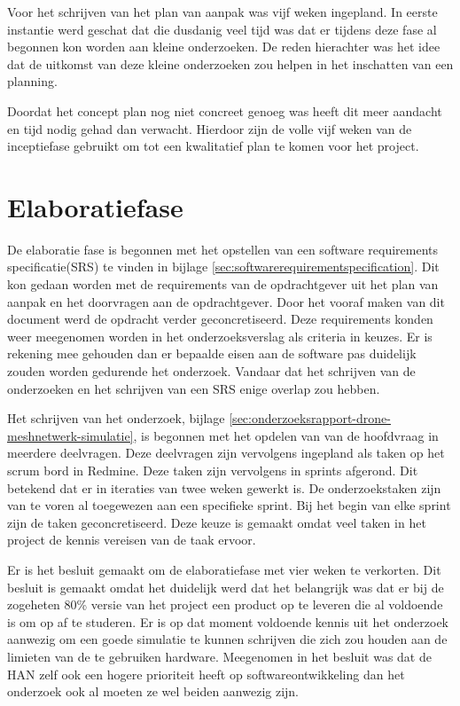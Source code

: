 \documentclass[a4paper, 11pt, oneside]{report}
\begin{document}
Voor het schrijven van het plan van aanpak was vijf weken ingepland. 
In eerste instantie werd geschat dat die dusdanig veel tijd was dat er tijdens deze fase al begonnen kon worden aan kleine onderzoeken.
De reden hierachter was het idee dat de uitkomst van deze kleine onderzoeken zou helpen in het inschatten van een planning.

Doordat het concept plan nog niet concreet genoeg was heeft dit meer aandacht en tijd nodig gehad dan verwacht. 
Hierdoor zijn de volle vijf weken van de inceptiefase gebruikt om tot een kwalitatief plan te komen voor het project.

\section{Elaboratiefase}\label{sec:elaboratiefase}

De elaboratie fase is begonnen met het opstellen van een software requirements specificatie(SRS) te vinden in bijlage \ref{sec:softwarerequirementspecification}.
Dit kon gedaan worden met de requirements van de opdrachtgever uit het plan van aanpak en het doorvragen aan de opdrachtgever.
Door het vooraf maken van dit document werd de opdracht verder geconcretiseerd.
Deze requirements konden weer meegenomen worden in het onderzoeksverslag als criteria in keuzes.  
Er is rekening mee gehouden dan er bepaalde eisen aan de software pas duidelijk zouden worden gedurende het onderzoek.
Vandaar dat het schrijven van de onderzoeken en het schrijven van een SRS enige overlap zou hebben. 

Het schrijven van het onderzoek, bijlage \ref{sec:onderzoeksrapport-drone-meshnetwerk-simulatie}, is begonnen met het opdelen van van de hoofdvraag in meerdere deelvragen. 
Deze deelvragen zijn vervolgens ingepland als taken op het scrum bord in Redmine.
Deze taken zijn vervolgens in sprints afgerond. 
Dit betekend dat er in iteraties van twee weken gewerkt is. 
De onderzoekstaken zijn van te voren al toegewezen aan een specifieke sprint.
Bij het begin van elke sprint zijn de taken geconcretiseerd.
Deze keuze is gemaakt omdat  veel taken in het project de kennis vereisen van de taak ervoor.

Er is het besluit gemaakt om de elaboratiefase met vier weken te verkorten. 
Dit besluit is gemaakt omdat het duidelijk werd dat het belangrijk was dat er bij de zogeheten 80\% versie van het project een product op te leveren die al voldoende is om op af te studeren. 
Er is op dat moment voldoende kennis uit het onderzoek aanwezig om een goede simulatie te kunnen schrijven die zich zou houden aan de limieten van de te gebruiken hardware. 
Meegenomen in het besluit was dat de HAN zelf ook een hogere prioriteit heeft op softwareontwikkeling dan het onderzoek ook al moeten ze wel beiden aanwezig zijn.
\end{document}
